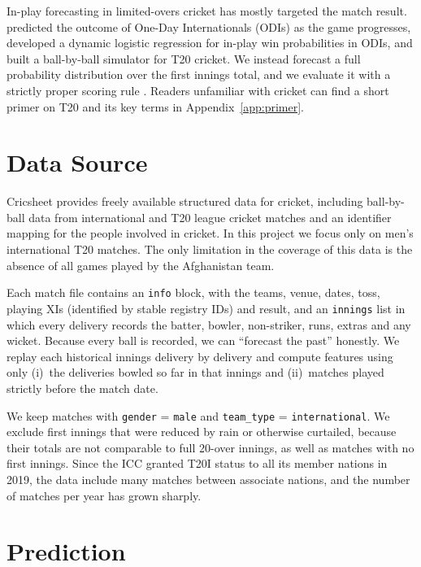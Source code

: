 \documentclass{article}
\newcommand{\1}{\mathbf{1}}
\begin{document}
In-play forecasting in limited-overs cricket has mostly targeted the match result. \citet{bailey2006} predicted the outcome of One-Day Internationals (ODIs) as the game progresses, \citet{asif2016} developed a dynamic logistic regression for in-play win probabilities in ODIs, and \citet{davis2015} built a ball-by-ball simulator for T20 cricket. We instead forecast a full probability distribution over the first innings total, and we evaluate it with a strictly proper scoring rule \citep{gneiting2007}. Readers unfamiliar with cricket can find a short primer on T20 and its key terms in Appendix~\ref{app:primer}.

\section{Data Source}\label{sec:data}
Cricsheet \citep{cricsheet} provides freely available structured data for cricket, including ball-by-ball data from international and T20 league cricket matches and an identifier mapping for the people involved in cricket. In this project we focus only on men's international T20 matches. The only limitation in the coverage of this data is the absence of all games played by the Afghanistan team.

Each match file contains an \texttt{info} block, with the teams, venue, dates, toss, playing XIs (identified by stable registry IDs) and result, and an \texttt{innings} list in which every delivery records the batter, bowler, non-striker, runs, extras and any wicket. Because every ball is recorded, we can ``forecast the past'' honestly. We replay each historical innings delivery by delivery and compute features using only (i)~the deliveries bowled so far in that innings and (ii)~matches played strictly before the match date.

We keep matches with \texttt{gender} = \texttt{male} and \texttt{team\_type} = \texttt{international}. We exclude first innings that were reduced by rain or otherwise curtailed, because their totals are not comparable to full 20-over innings, as well as matches with no first innings. Since the ICC granted T20I status to all its member nations in 2019, the data include many matches between associate nations, and the number of matches per year has grown sharply.

\section{Prediction}
\end{document}

